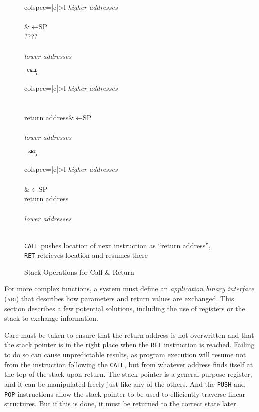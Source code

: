 \documentclass[12pt,english]{book}
\newcommand*{\concept}[2][]{%
  \textit{#2}\ifx#1\empty\empty\index{#2}\else\index{#1}\fi}
\begin{document}
\begin{figure}[ht!]\centering
  \begin{tblr}{colspec={|c|>{\hspace*{-3mm}}l}}
    \textit{higher addresses}\\\\
    &\({}\leftarrow\text{SP}\)\\
    ????\\\\
    \textit{lower addresses}\\
  \end{tblr}
  \({}\stackrel{\text{\texttt{CALL}}}{\longrightarrow}{}\)
  \begin{tblr}{colspec={|c|>{\hspace*{-3mm}}l}}
    \textit{higher addresses}\\\\
    \\
    return address&\({}\leftarrow\text{SP}\)\\\\
    \textit{lower addresses}
  \end{tblr}
  \({}\stackrel{\text{\texttt{RET}}}{\longrightarrow}{}\)
  \begin{tblr}{colspec={|c|>{\hspace*{-3mm}}l}}
    \textit{higher addresses}\\\\
    &\({}\leftarrow\text{SP}\)\\
    return address\\\\
    \textit{lower addresses}
  \end{tblr}\\
  \texttt{CALL} pushes location of next instruction as
  ``return address'',\\
  \texttt{RET} retrieves location and resumes there
  \caption{Stack Operations for Call \& Return}
  \label{fig:crstack}
\end{figure}

For more complex functions,
a system must define an \concept{application binary interface}
(\textsc{abi})
that describes how parameters and return values are exchanged.
This section describes a few potential solutions,
including the use of registers or the stack to exchange information.

Care must be taken to ensure that the return address
is not overwritten
and that the stack pointer is in the right place
when the \texttt{RET} instruction is reached.
Failing to do so can cause unpredictable results,
as program execution will resume
not from the instruction following the \texttt{CALL},
but from whatever address finds itself at the top of the stack
upon return.
The stack pointer is a general-purpose register,
and it can be manipulated freely
just like any of the others.
And the \texttt{PUSH} and \texttt{POP}
instructions allow the stack pointer
to be used to efficiently traverse linear structures.
But if this is done,
it must be returned to the correct state later.
\end{document}
